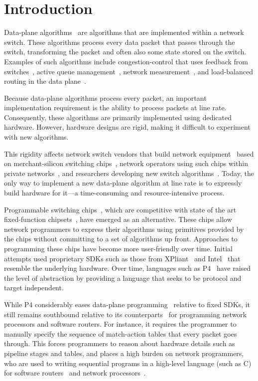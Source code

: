 \section{Introduction}
\label{s:intro}

Data-plane algorithms~\cite{cestan} are algorithms that are implemented within
a network switch. These algorithms process every data packet that passes
through the switch, transforming the packet and often also some state stored on
the switch.  Examples of such algorithms include congestion-control that uses
feedback from switches~\cite{xcp, rcp, pdq, dctcp}, active queue
management~\cite{codel}, network measurement~\cite{opensketch, bitmap_george,
elephant_george}, and load-balanced routing in the data plane~\cite{conga}.

Because data-plane algorithms process every packet, an important implementation
requirement is the ability to process packets at line rate.  Consequently,
these algorithms are primarily implemented using dedicated hardware. However,
hardware designs are rigid, making it difficult to experiment with new
algorithms.

This rigidity affects network switch vendors that build network
equipment~\cite{cisco_nexus, dell_force10, arista_7050} based on
merchant-silicon switching chips~\cite{trident, tomahawk, mellanox}, network
operators using such chips within private networks~\cite{google,facebook,vl2},
and researchers developing new switch algorithms~\cite{xcp, codel, d3, detail,
pdq}. Today, the only way to implement a new data-plane algorithm at line rate
is to expressly build hardware for it---a time-consuming and resource-intensive
process.

Programmable switching chips~\cite{flexpipe, xpliant, rmt}, which are competitive
with state of the art fixed-function chipsets~\cite{trident, tomahawk,
mellanox}, have emerged as an alternative.  These chips allow network programmers to
express their algorithms using primitives provided by the chips without
committing to a set of algorithms up front. Approaches to programming these
chips have become more user-friendly over time. Initial attempts
used proprietary SDKs such as those from XPliant~\cite{xpliant_sdk,
xpliant_sdk2} and Intel~\cite{intel_sdk} that resemble the underlying hardware.
Over time, languages such as P4~\cite{p4, p4spec} have raised the level of
abstraction by providing a language that seeks to be protocol and target independent.

While P4 considerably eases data-plane programming~\cite{dc_p4} relative to
fixed SDKs, it still remains southbound relative to its
counterparts~\cite{packetc, nova, click} for programming network processors and
software routers. For instance, it requires the programmer to manually specify the sequence of
match-action tables that every packet goes through. This forces programmers to
reason about hardware details such as pipeline stages and tables, and places a high
burden on network programmers, who are used to writing sequential programs in a
high-level language (such as C) for software routers~\cite{click} and network
processors~\cite{ixp4xx, ixp2800}.

